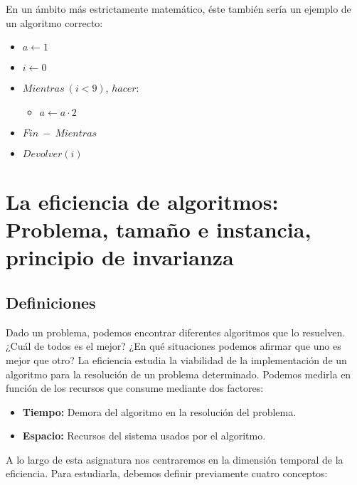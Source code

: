 En un ámbito más estrictamente matemático, éste también sería un ejemplo de un algoritmo correcto:

\begin{itemize}
	\item$a\leftarrow1$
	\item$i\leftarrow0$
	\item$Mientras\ (i<9)$, $hacer$:
	\begin{itemize}
		\item$a\leftarrow a\cdot2$
	\end{itemize}
	\item$Fin\ -\ Mientras$
	\item$Devolver(i)$
\end{itemize}

\section{La eficiencia de algoritmos: Problema, tamaño e instancia, principio de invarianza}

\subsection{Definiciones}

Dado un problema, podemos encontrar diferentes algoritmos que lo resuelven.
¿Cuál de todos es el mejor?
¿En qué situaciones podemos afirmar que uno es mejor que otro?
La eficiencia estudia la viabilidad de la implementación de un algoritmo para la resolución de un problema determinado.
Podemos medirla en función de los recursos que consume mediante dos factores:

\begin{itemize}
	\item\textbf{Tiempo:} Demora del algoritmo en la resolución del problema.
	\item\textbf{Espacio:} Recursos del sistema usados por el algoritmo.
\end{itemize}

A lo largo de esta asignatura nos centraremos en la dimensión temporal de la eficiencia.
Para estudiarla, debemos definir previamente cuatro conceptos:

